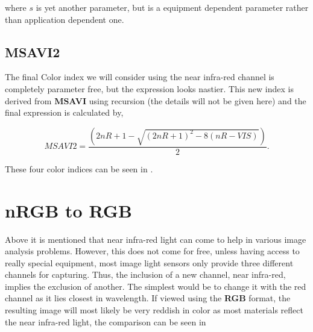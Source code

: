 where $s$ is yet another parameter, but is a equipment dependent parameter rather than application dependent one.


\subsection{MSAVI2}

The final Color index we will consider using the near infra-red channel is completely parameter free, but the expression looks nastier. This new index is derived from \textbf{MSAVI} using recursion (the details will not be given here) and the final expression is calculated by,

\begin{equation}
    MSAVI2 = \frac{\left(2nR+1-\sqrt{\left(2nR+1\right)^2-8\left(nR-VIS\right)}\right)}{2}.
\end{equation}


These four color indices can be seen in .

\section{nRGB to RGB}

Above it is mentioned that near infra-red light can come to help in various image analysis problems. However, this does not come for free, unless having access to really special equipment, most image light sensors only provide three different channels for capturing. Thus, the inclusion of a new channel, near infra-red, implies the exclusion of another. The simplest would be to change it with the red channel as it lies closest in wavelength. If viewed using the \textbf{RGB} format, the resulting image will most likely be very reddish in color as most materials reflect the near infra-red light, the comparison can be seen in 



